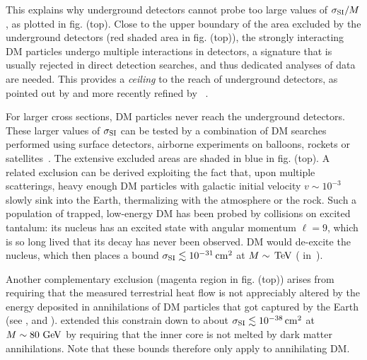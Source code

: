 This explains why underground detectors cannot probe too large values of $\sigma_{\rm SI}/M$, as plotted in fig. (top).
Close to the upper boundary of the area excluded by the underground detectors (red shaded area in fig. (top)), the strongly interacting DM particles undergo multiple interactions in detectors, a signature that is usually rejected in direct detection searches, and thus dedicated analyses of data are needed. This provides a {\em ceiling} to the reach of underground detectors, as pointed out by  and more recently refined by ~\cite{SIMP}.

\smallskip

For larger cross sections, DM particles never reach the underground detectors.
These larger values of $\sigma_{\rm SI}$ can be tested by a combination of DM searches performed using surface detectors, airborne experiments on balloons, rockets or satellites~\cite{SIMP}. The extensive excluded areas are shaded in blue in fig. (top). 
A related exclusion can be derived exploiting the fact that, upon multiple scatterings, heavy enough DM particles with galactic initial velocity $v \sim 10^{-3}$ slowly sink into the Earth, thermalizing with the atmosphere or the rock. Such a population of trapped, low-energy DM has been probed by  collisions on excited tantalum: its nucleus has
an excited state with angular momentum $\ell=9$, which is so long lived that its decay has never been observed. DM would de-excite the nucleus, which then places a bound $\sigma_{\rm SI}\lesssim 10^{-31}\,{\rm cm}^2$ at $M \sim\,{\rm TeV}$ ( in~\cite{SIMP}).

\smallskip

Another complementary exclusion (magenta region in fig. (top)) arises from requiring that  the measured terrestrial heat flow is not appreciably altered by the energy deposited in annihilations of DM particles that got captured by the Earth (see ,  and ). 
 extended this constrain down to about $\sigma_{\rm SI}\lesssim 10^{-38}\,{\rm cm}^2$ at $M \sim 80 \, \,{\rm GeV}$ by requiring that the inner core is not melted by dark matter annihilations. Note that these bounds therefore only apply to annihilating DM.

\smallskip

